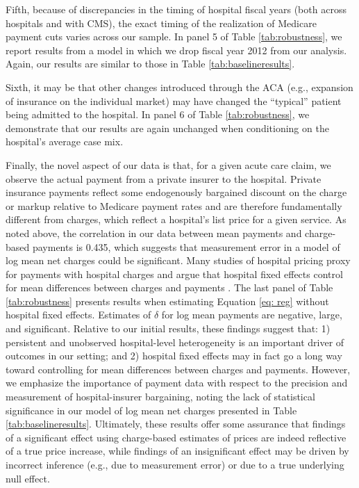 \documentclass[12pt]{article}
\begin{document}
Fifth, because of discrepancies in the timing of hospital fiscal years (both across hospitals and with CMS), the exact timing of the realization of Medicare payment cuts varies across our sample. In panel 5 of Table \ref{tab:robustness}, we report results from a model in which we drop fiscal year 2012 from our analysis. Again, our results are similar to those in Table \ref{tab:baselineresults}.

Sixth, it may be that other changes introduced through the ACA (e.g., expansion of insurance on the individual market) may have changed the ``typical'' patient being admitted to the hospital. In panel 6 of Table \ref{tab:robustness}, we demonstrate that our results are again unchanged when conditioning on the hospital's average case mix.

Finally, the novel aspect of our data is that, for a given acute care claim, we observe the actual payment from a private insurer to the hospital. Private insurance payments reflect some endogenously bargained discount on the charge or markup relative to Medicare payment rates and are therefore fundamentally different from charges, which reflect a hospital's list price for a given service. As noted above, the correlation in our data between mean payments and charge-based payments is 0.435, which suggests that measurement error in a model of log mean net charges could be significant. Many studies of hospital pricing proxy for payments with hospital charges and argue that hospital fixed effects control for mean differences between charges and payments \citep{cutler2000}. The last panel of Table \ref{tab:robustness} presents results when estimating Equation \ref{eq: reg} without hospital fixed effects.  Estimates of $\delta$ for log mean payments are negative, large, and significant. Relative to our initial results, these findings suggest that: 1) persistent and unobserved hospital-level heterogeneity is an important driver of outcomes in our setting; and 2) hospital fixed effects may in fact go a long way toward controlling for mean differences between charges and payments. However, we emphasize the importance of payment data with respect to the precision and measurement of hospital-insurer bargaining, noting the lack of statistical significance in our model of log mean net charges presented in Table \ref{tab:baselineresults}. Ultimately, these results offer some assurance that findings of a significant effect using charge-based estimates of prices are indeed reflective of a true price increase, while findings of an insignificant effect may be driven by incorrect inference (e.g., due to measurement error) or due to a true underlying null effect.
\end{document}

